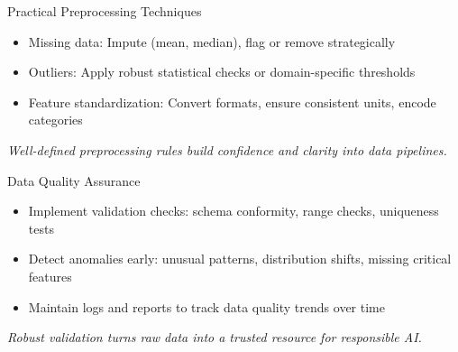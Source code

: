 \documentclass[aspectratio=169]{beamer}
\begin{document}
%
%
\begin{frame}{Practical Preprocessing Techniques}
\begin{itemize}
\item Missing data: Impute (mean, median), flag or remove strategically
\item Outliers: Apply robust statistical checks or domain-specific thresholds
\item Feature standardization: Convert formats, ensure consistent units, encode categories
\end{itemize}

\vspace{0.8em}
\emph{Well-defined preprocessing rules build confidence and clarity into data pipelines.}

\end{frame}

%
%
\begin{frame}{Data Quality Assurance}
\begin{itemize}
\item Implement validation checks: schema conformity, range checks, uniqueness tests
\item Detect anomalies early: unusual patterns, distribution shifts, missing critical features
\item Maintain logs and reports to track data quality trends over time
\end{itemize}

\vspace{0.8em}
\emph{Robust validation turns raw data into a trusted resource for responsible AI.}

\end{frame}
\end{document}
